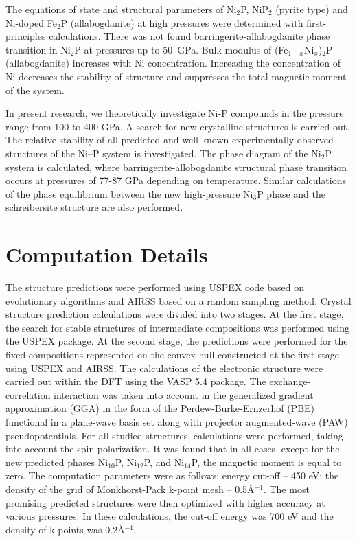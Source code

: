 \documentclass[twoside,twocolumn,9pt]{article}
\begin{document}
The equations of state and structural parameters of Ni$_2$P, NiP$_2$ (pyrite type) and Ni-doped Fe$_2$P (allabogdanite) at high pressures were determined with first-principles calculations.\cite{Nisar-2010-EPSL}
There was not found barringerite-allabogdanite phase transition in Ni$_2$P at pressures up to 50~GPa. 
Bulk modulus of (Fe$_{1-x}$Ni$_x$)$_2$P (allabogdanite) increases with Ni concentration. 
Increasing the concentration of Ni decreases the stability of structure and suppresses the total magnetic moment of the system. 

In present research, we theoretically investigate Ni-P compounds in the pressure range from 100 to 400 GPa. 
A search for new crystalline structures is carried out.
The relative stability of all predicted and well-known experimentally observed structures of the Ni--P system is investigated. 
The phase diagram of the Ni$_2$P system is calculated, where barringerite-allobogdanite structural phase transition occurs at pressures of 77-87 GPa depending on temperature. 
Similar calculations of the phase equilibrium between the new high-pressure Ni$_3$P phase and the schreibersite structure are also performed.



   


\section{Computation Details}

The structure predictions were performed using USPEX code based on evolutionary algorithms \cite{USPEX-GLASS2006713, USPEX-OGANOV-2006, USPEX-LYAKHOV-2010-1623} and AIRSS based on
a random sampling method.\cite{AIRSS-PhysRevLett.97.045504, AIRSS-Pickard_2011} 
Crystal structure prediction calculations were divided into two stages. At the first stage, the search for stable structures of intermediate compositions was performed using the USPEX package. 
At the second stage, the predictions were performed for the fixed compositions represented on the convex hull constructed at the first stage using USPEX and AIRSS.
The calculations of the electronic structure were carried out within the DFT using the VASP 5.4 package.\cite{VASP-1-PhysRevB.59.1758, VASP-2-PhysRevB.54.11169}
The exchange-correlation interaction was taken into account in the generalized  gradient approximation (GGA) in the form of the Perdew-Burke-Ernzerhof (PBE) functional \cite{PBE-PhysRevLett.78.1396} in a plane-wave basis set along with projector augmented-wave (PAW) pseudopotentials.\cite{PAW-PhysRevB.50.17953} 
For all studied structures, calculations were performed, taking into account the spin polarization. It was found that in all cases, except for the new predicted phases Ni$_{10}$P, Ni$_{12}$P, and Ni$_{14}$P, the magnetic moment is equal to zero. 
The computation parameters were as follows: energy cut-off -- 450 eV; the density of the grid of Monkhorst-Pack k-point mesh -- 0.5\AA$^{-1}$. 
The most promising predicted structures were then optimized with higher accuracy at various pressures. 
In these calculations, the cut-off energy was 700 eV and the density of k-points was 0.2\AA$^{-1}$. 
\end{document}
